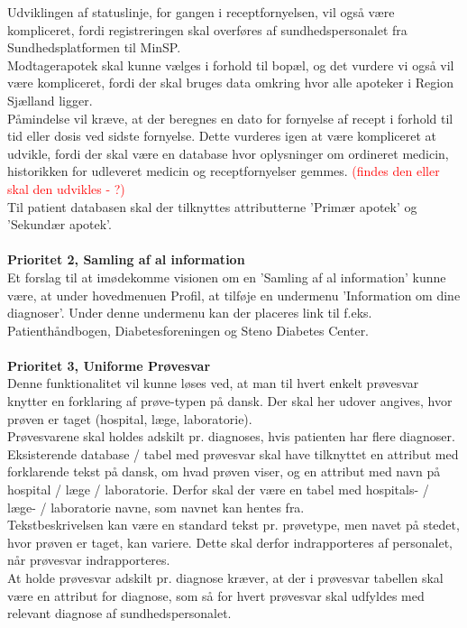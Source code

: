Udviklingen af statuslinje, for gangen i receptfornyelsen, vil også være kompliceret, fordi registreringen skal overføres af sundhedspersonalet fra Sundhedsplatformen til MinSP.\\
Modtagerapotek skal kunne vælges i forhold til bopæl, og det vurdere vi også vil være kompliceret, fordi der skal bruges data omkring hvor alle apoteker i Region Sjælland ligger.\\
Påmindelse vil kræve, at der beregnes en dato for fornyelse af recept i forhold til tid eller dosis ved sidste fornyelse. Dette vurderes igen at være kompliceret at udvikle, fordi der skal være en database hvor oplysninger om ordineret medicin, historikken for udleveret medicin og receptfornyelser gemmes. \textcolor{red}{(findes den eller skal den udvikles - ?)} \\ 
Til patient databasen skal der tilknyttes attributterne 'Primær apotek' og 'Sekundær apotek'.
\\\\
\textbf{Prioritet 2, Samling af al information} \\
Et forslag til at imødekomme visionen om en 'Samling af al information' kunne være, at under hovedmenuen Profil, at tilføje en undermenu 'Information om dine diagnoser'. Under denne undermenu kan der placeres link til f.eks. Patienthåndbogen, Diabetesforeningen og Steno Diabetes Center.
\\\\ 
\textbf{Prioritet 3, Uniforme Prøvesvar} \\
Denne funktionalitet vil kunne løses ved, at man til hvert enkelt prøvesvar knytter en forklaring af prøve-typen på dansk. Der skal her udover angives, hvor prøven er taget (hospital, læge, laboratorie).\\
Prøvesvarene skal holdes adskilt pr. diagnoses, hvis patienten har flere diagnoser.\\
Eksisterende database / tabel med prøvesvar skal have tilknyttet en attribut med forklarende tekst på dansk, om hvad prøven viser, og en attribut med navn på hospital / læge / laboratorie. Derfor skal der være en tabel med hospitals- / læge- / laboratorie navne, som navnet kan hentes fra.\\ 
Tekstbeskrivelsen kan være en standard tekst pr. prøvetype, men navet på stedet, hvor prøven er taget, kan variere. Dette skal derfor indrapporteres af personalet, når prøvesvar indrapporteres. \\
At holde prøvesvar adskilt pr. diagnose kræver, at der i prøvesvar tabellen skal være en attribut for diagnose, som så for hvert prøvesvar skal udfyldes med relevant diagnose af sundhedspersonalet.\\
